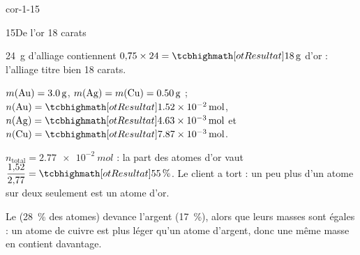 \begin{blocLivre}{cor-1-15}
\begin{corrige}{15}{De l'or 18 carats}
\begin{questions}
\item \qty{24}{g} d'alliage contiennent $0{,}75\times24=\res{\qty{18}{g}}$ d'or : l'alliage titre bien 18 carats.
\item $m(\ce{Au})=\qty{3,0}{g}$, $m(\ce{Ag})=m(\ce{Cu})=\qty{0,50}{g}$ ; $n(\ce{Au})=\res{\qty{1,52e-2}{mol}}$, $n(\ce{Ag})=\res{\qty{4,63e-3}{mol}}$ et
$n(\ce{Cu})=\res{\qty{7,87e-3}{mol}}$.
\item $n_\text{total}=\qty{2,77e-2}{mol}$ : la part des atomes d'or vaut $\dfrac{1{,}52}{2{,}77}=\res{\qty{55}{\percent}}$. Le client a tort : un peu plus d'un atome
sur deux seulement est un atome d'or.
\item Le  (28~\% des atomes) devance l'argent (17~\%), alors que leurs masses sont égales : un atome de cuivre est plus
léger qu'un atome d'argent, donc une même masse en contient davantage.
\end{questions}
\end{corrige}
\end{blocLivre}
